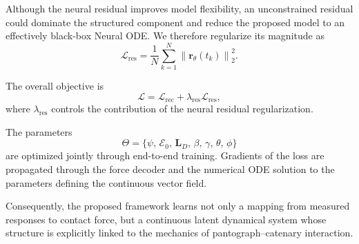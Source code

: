 \documentclass[journal,twoside]{IEEEtran}
\begin{document}
Although the neural residual improves model flexibility, an unconstrained
residual could dominate the structured component and reduce the proposed
model to an effectively black-box Neural ODE. We therefore regularize its
magnitude as
\begin{equation}
    \mathcal{L}_{\mathrm{res}}
    =
    \frac{1}{N}
    \sum_{k=1}^{N}
    \left\|
        \mathbf{r}_{\theta}(t_k)
    \right\|_2^2.
    \label{eq:residual_loss}
\end{equation}

The overall objective is
\begin{equation}
    \mathcal{L}
    =
    \mathcal{L}_{\mathrm{rec}}
    +
    \lambda_{\mathrm{res}}
    \mathcal{L}_{\mathrm{res}},
    \label{eq:total_loss}
\end{equation}
where $\lambda_{\mathrm{res}}$ controls the contribution of the neural
residual regularization.

The parameters
\begin{equation}
    \Theta
    =
    \{
        \psi,\,
        \mathcal{E}_{0},\,
        \mathbf{L}_{D},\,
        \beta,\,
        \gamma,\,
        \theta,\,
        \phi
    \}
    \label{eq:trainable_parameters}
\end{equation}
are optimized jointly through end-to-end training. Gradients of the loss are
propagated through the force decoder and the numerical ODE solution to the
parameters defining the continuous vector field.

Consequently, the proposed framework learns not only a mapping from measured
responses to contact force, but a continuous latent dynamical system whose
structure is explicitly linked to the mechanics of pantograph--catenary
interaction.
\end{document}
